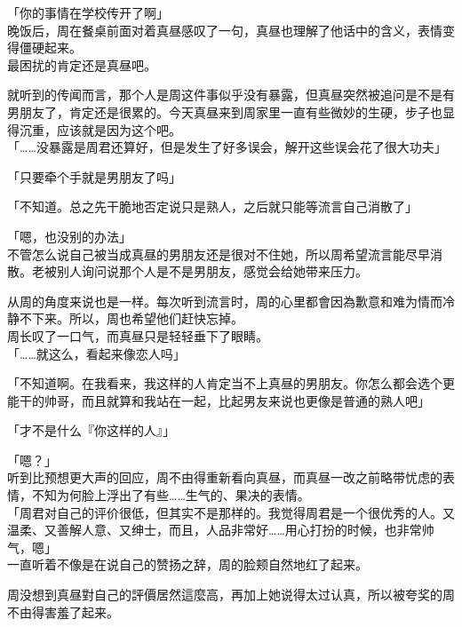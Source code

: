 「你的事情在学校传开了啊」\\

晚饭后，周在餐桌前面对着真昼感叹了一句，真昼也理解了他话中的含义，表情变得僵硬起来。\\

最困扰的肯定还是真昼吧。

就听到的传闻而言，那个人是周这件事似乎没有暴露，但真昼突然被追问是不是有男朋友了，肯定还是很累的。今天真昼来到周家里一直有些微妙的生硬，步子也显得沉重，应该就是因为这个吧。\\

「……没暴露是周君还算好，但是发生了好多误会，解开这些误会花了很大功夫」

「只要牵个手就是男朋友了吗」

「不知道。总之先干脆地否定说只是熟人，之后就只能等流言自己消散了」

「嗯，也没别的办法」\\

不管怎么说自己被当成真昼的男朋友还是很对不住她，所以周希望流言能尽早消散。老被别人询问说那个人是不是男朋友，感觉会给她带来压力。

从周的角度来说也是一样。每次听到流言时，周的心里都會因為歉意和难为情而冷静不下来。所以，周也希望他们赶快忘掉。\\

周长叹了一口气，而真昼只是轻轻垂下了眼睛。\\

「……就这么，看起来像恋人吗」

「不知道啊。在我看来，我这样的人肯定当不上真昼的男朋友。你怎么都会选个更能干的帅哥，而且就算和我站在一起，比起男友来说也更像是普通的熟人吧」

「才不是什么『你这样的人』」

「嗯？」\\

听到比预想更大声的回应，周不由得重新看向真昼，而真昼一改之前略带忧虑的表情，不知为何脸上浮出了有些……生气的、果决的表情。\\

「周君对自己的评价很低，但其实不是那样的。我觉得周君是一个很优秀的人。又温柔、又善解人意、又绅士，而且，人品非常好……用心打扮的时候，也非常帅气，嗯」\\

一直听着不像是在说自己的赞扬之辞，周的脸颊自然地红了起来。

周没想到真昼對自己的評價居然這麼高，再加上她说得太过认真，所以被夸奖的周不由得害羞了起来。\\


